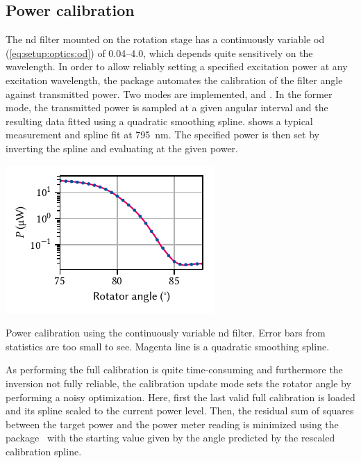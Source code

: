\subsection{Power calibration}\label{subsec:sec:exp:mjolnir:calibration:power}
The \gls{nd} filter
mounted on the \thorlabsrotator rotation stage has a continuously variable \gls{od} (\cref{eq:setup:optics:od}) of \numrange{0.04}{4.0}, which depends quite sensitively on the wavelength.
In order to allow reliably setting a specified excitation power at any excitation wavelength, the \mjolnir package automates the calibration of the filter angle against transmitted power.
Two modes are implemented,  and .
In the former mode, the transmitted power is sampled at a given angular interval and the resulting data fitted using a quadratic smoothing spline.
 shows a typical measurement and spline fit at \qty{795}{\nano\meter}.
The specified power is then set by inverting the spline and evaluating at the given power.

\begin{marginfigure}
    \centering
    \includegraphics{img/pdf/experiment/power_calibration}
    \caption[]{
        Power calibration using the continuously variable \acrshort{nd} filter.
        Error bars from statistics are too small to see.
        Magenta line is a quadratic smoothing spline.
    }
    \label{fig:exp:mjolnir:power_calibration}
\end{marginfigure}

As performing the full calibration is quite time-consuming and furthermore the inversion not fully reliable, the  calibration update mode sets the rotator angle by performing a noisy optimization.
Here, first the last valid full calibration is loaded and its spline scaled to the current power level.
Then, the residual sum of squares between the target power and the power meter reading is minimized using the  package~\cite{Mayer2016} with the starting value given by the angle predicted by the rescaled calibration spline.

